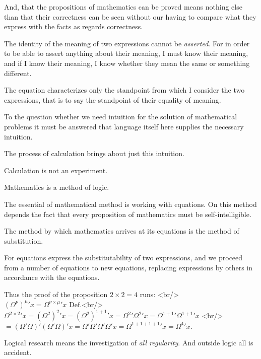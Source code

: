 {And, that the propositions of mathematics can
be proved means nothing else than that their
correctness can be seen without our having to
compare what they express with the facts as regards
correctness.}


{The identity of the meaning of two expressions
cannot be \emph{asserted}. For in order to be able to
assert anything about their meaning, I must know
their meaning, and if I know their meaning, I
know whether they mean the same or something
different.}


{The equation characterizes only the standpoint
from which I consider the two expressions, that
is to say the standpoint of their equality of
meaning.}


{To the question whether we need intuition for
the solution of mathematical problems it must be
answered that language itself here supplies the
necessary intuition.}


{The process of calculation brings about just
this intuition.

Calculation is not an experiment.}


{Mathematics is a method of logic.}


{The essential of mathematical method is working
with equations. On this method depends the
fact that every proposition of mathematics must
be self-intelligible.}


{The method by which mathematics arrives at
its equations is the method of substitution.

For equations express the substitutability of
two expressions, and we proceed from a number
of equations to new equations, replacing expressions
by others in accordance with the
equations.}


{Thus the proof of the proposition $2 \times 2 = 4$ runs: <br/>
$(\Omega^{\nu})^{\mu}{}'x = \Omega^{\nu \times \mu}{}'x \text{ Def.} $<br/>
$\Omega^{2 \times 2}{}'x = (\Omega^{2})^{2}{}'x = (\Omega^{2})^{1 + 1}{}'x = \Omega^{2}{}'\Omega^{2}{}'x = \Omega^{1 + 1}{}'\Omega^{1 + 1}{}'x$ <br/>
$= (\Omega'\Omega)'(\Omega'\Omega)'x = \Omega'\Omega'\Omega'\Omega'x = \Omega^{1 + 1 + 1 + 1}{}'x = \Omega^{4}{}'x.$
}


{Logical research means the investigation of \emph{all
\enlargethispage{2pt} %
regularity}. And outside logic all is accident.}


